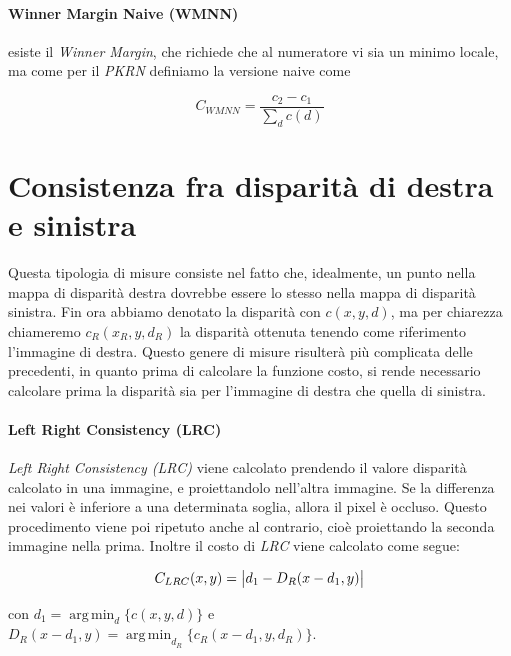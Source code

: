 \documentclass[12pt]{report}
\DeclarePairedDelimiter{\abs}{\lvert}{\rvert}    %
\DeclareMathOperator*{\argmin}{arg\,min} %
\begin{document}
				
			\paragraph{Winner Margin Naive (WMNN)}
			
				esiste il \textit{Winner Margin}, che richiede che al numeratore vi sia un minimo locale, ma come per il \textit{PKRN} definiamo la versione naive come
				
				\begin{equation}
					C_{WMNN}=\frac{c_{2}-c_{1}}{\sum_{d}c(d)}
					\label{eq:WMNN} 
				\end{equation}
					
				
				
		\section{Consistenza fra disparità di destra e sinistra}
		\label{sec:leftRight}
			
			Questa tipologia di misure consiste nel fatto che, idealmente, un punto nella mappa di disparità destra dovrebbe essere lo stesso nella mappa di disparità sinistra. Fin ora abbiamo denotato la disparità con $c(x,y,d)$, ma per chiarezza chiameremo $c_{R}(x_{R},y,d_{R})$ la disparità ottenuta tenendo come riferimento l'immagine di destra. Questo genere di misure risulterà più complicata delle precedenti, in quanto prima di calcolare la funzione costo, si rende necessario calcolare prima la disparità sia per l'immagine di destra che quella di sinistra. 		
		
			\paragraph{Left Right Consistency (LRC)}
			\label{par:LRC}
			
				\textit{Left Right Consistency (LRC)} viene calcolato prendendo il valore disparità calcolato in una immagine, e proiettandolo nell'altra immagine. Se la differenza nei valori è inferiore a una determinata soglia, allora il pixel è occluso. Questo procedimento viene poi ripetuto anche al contrario, cioè proiettando la seconda immagine nella prima. Inoltre il costo di \textit{LRC} viene calcolato come segue:
				
				\begin{equation}
					C_{LRC}(x,y)=\abs[\big]{d_{1}-D_{R}(x-d_{1},y)}
					\label{eq:LRC}
				\end{equation}	
				
				\noindent con $d_{1}=\argmin_{d}\bigr\{c(x,y,d)\bigr\}$ e $D_{R}(x-d_{1},y)=\argmin_{d_{R}}\bigr\{c_{R}(x-d_{1},y,d_{R})\bigr\}$.
				
\end{document}

